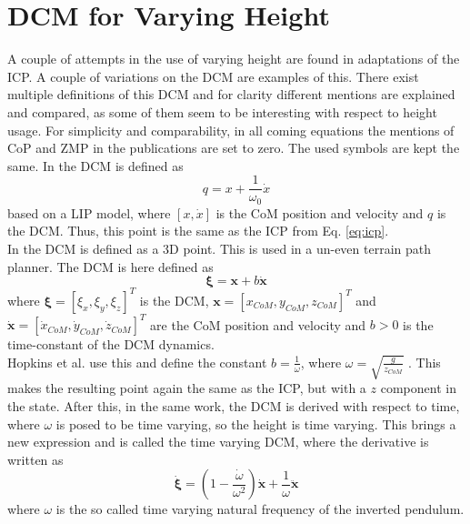 \section{\ac{DCM} for Varying Height}
A couple of attempts in the use of varying height are found in adaptations of the \ac{ICP}. A couple of variations on the \acf{DCM} are examples of this. There exist multiple definitions of this \ac{DCM} and for clarity different mentions are explained and compared, as some of them seem to be interesting with respect to height usage. For simplicity and comparability, in all coming equations the mentions of \ac{CoP} and \ac{ZMP} in the publications are set to zero. The used symbols are kept the same. In \cite{takenaka2009real} the \ac{DCM} is defined as 
\begin{equation}
q = x + \frac{1}{\omega_0}\dot{x}
\label{eq:takenakadcm}
\end{equation} 
based on a \ac{LIP} model, where $[x,\dot{x}]$ is the \ac{CoM} position and velocity and $q$ is the \ac{DCM}. Thus, this point is the same as the \ac{ICP} from Eq. \eqref{eq:icp}. \\
In \cite{englsberger2013three} the \ac{DCM} is defined as a \ac{3D} point. This is used in a un-even terrain path planner. The \ac{DCM} is here defined as
\begin{equation}
\boldsymbol{\xi} = \boldsymbol{x} + b\boldsymbol{\dot{x}}
\label{eq:englsdcm}
\end{equation}
where $\boldsymbol{\xi}=[\xi_x,\xi_y,\xi_z]^T$ is the \ac{DCM}, $\boldsymbol{x}=[x_{CoM}, y_{CoM}, z_{CoM}]^T$ and $\boldsymbol{\dot{x}}=[\dot{x}_{CoM}, \dot{y}_{CoM}, \dot{z}_{CoM}]^T$ are the \ac{CoM} position and velocity and $b>0$ is the time-constant of the \ac{DCM} dynamics. \\
Hopkins et al. use this and define the constant $b=\frac{1}{\omega}$, where $\omega=\sqrt{\frac{g}{z_{CoM}}}$ \cite{hopkins2014humanoid}. This makes the resulting point again the same as the \ac{ICP}, but with a $z$ component in the state. After this, in the same work, the \ac{DCM} is derived with respect to time, where $\omega$ is posed to be time varying, so the height is time varying. This brings a new expression and is called the time varying \ac{DCM}, where the derivative is written as
\begin{equation}
\boldsymbol{\dot{\xi}}=(1-\frac{\dot{\omega}}{\omega^2})\boldsymbol{\dot{x}}+\frac{1}{\omega}\boldsymbol{\ddot{x}}
\end{equation}
where $\omega$ is the so called time varying natural frequency of the inverted pendulum.\\
